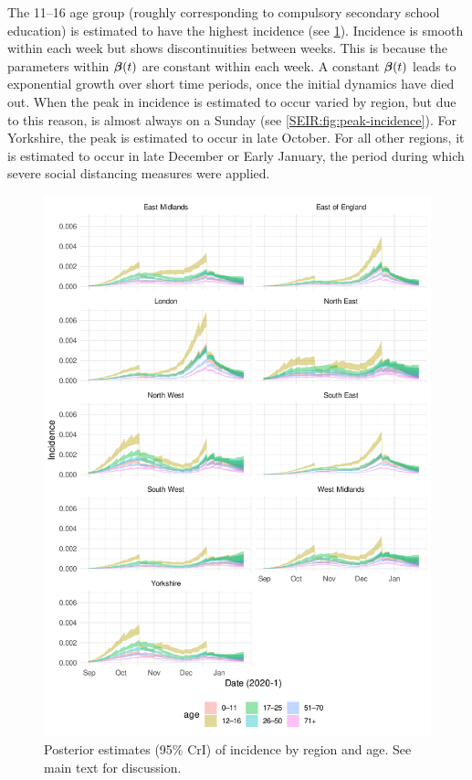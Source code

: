 \documentclass[thesis.tex]{subfiles}
\begin{document}
The 11--16 age group (roughly corresponding to compulsory secondary school education) is estimated to have the highest incidence (see \cref{SEIR:fig:incidence}).
Incidence is smooth within each week but shows discontinuities between weeks.
This is because the parameters within $\bm{\beta}(t)$ are constant within each week.
A constant $\bm{\beta}(t)$ leads to exponential growth over short time periods, once the initial dynamics have died out.
When the peak in incidence is estimated to occur varied by region, but due to this reason, is almost always on a Sunday (see \cref{SEIR:fig:peak-incidence}).
For Yorkshire, the peak is estimated to occur in late October.
For all other regions, it is estimated to occur in late December or Early January, the period during which severe social distancing measures were applied.
\begin{figure}
    \includegraphics{SEIR/CIS/incidence}
    \caption[Posterior estimates of incidence]{%
        Posterior estimates (95\% CrI) of incidence by region and age.
        See main text for discussion.
    }
    \label{SEIR:fig:incidence}
\end{figure}
\end{document}
